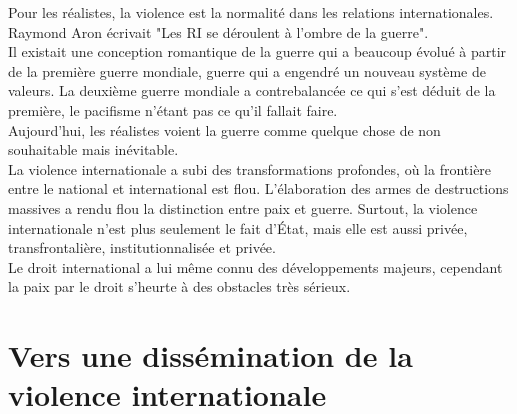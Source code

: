\documentclass[10pt, a4paper, openany]{book}
\begin{document}
Pour les réalistes, la violence est la normalité dans les relations internationales. Raymond Aron écrivait "Les RI se déroulent à l'ombre de la guerre". \\
Il existait une conception romantique de la guerre qui a beaucoup évolué à partir de la première guerre mondiale, guerre qui a engendré un nouveau système de valeurs. La deuxième guerre mondiale a contrebalancée ce qui s'est déduit de la première, le pacifisme n'étant pas ce qu'il fallait faire. \\
Aujourd'hui, les réalistes voient la guerre comme quelque chose de non souhaitable mais inévitable. \\
La violence internationale a subi des transformations profondes, où la frontière entre le national et international est flou. L'élaboration des armes de destructions massives a rendu flou la distinction entre paix et guerre. Surtout, la violence internationale n'est plus seulement le fait d'État, mais elle est aussi privée, transfrontalière, institutionnalisée et privée. \\
Le droit international a lui même connu des développements majeurs, cependant la paix par le droit s'heurte à des obstacles très sérieux. 

\section{Vers une dissémination de la violence internationale}
\end{document}
